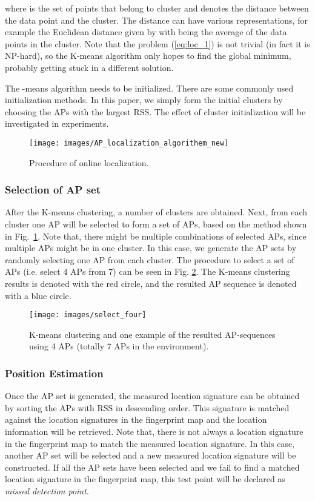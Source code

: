 \documentclass[10pt, conference, letterpaper]{IEEEtran}
\begin{document}
where  is the set of points that belong to cluster  and  denotes the distance between the data point  and the  cluster. 
The distance  can have various representations, for example the Euclidean distance given by  with  being the average of the data points in the  cluster. 
Note that the problem (\ref{eq:loc_1}) is not trivial (in fact it is NP-hard), so the K-means algorithm only hopes to find the global minimum, probably getting stuck in a different solution.

The -means algorithm needs to be initialized. 
There are some commonly used initialization methods. 
In this paper, we simply form the initial  clusters by choosing the  APs with the  largest RSS. 
The effect of cluster initialization will be investigated in experiments.

\begin{figure}
\centering
\texttt{[image: images/AP\_localization\_algorithem\_new]}
\caption{Procedure of online localization.}
\label{fig:algorithm_detailed}
\vspace{-0.2in}
\end{figure}

\subsubsection{Selection of AP set}
After the K-means clustering, a number of  clusters are obtained. 
Next, from each cluster one AP will be selected to form a set of  APs, based on the method shown in Fig.~\ref{fig:algorithm_detailed}. 
Note that, there might be multiple combinations of selected APs, since multiple APs might be in one cluster. 
In this case, we generate the AP sets by randomly selecting one AP from each cluster. 
The procedure to select a set of APs (i.e. select 4 APs from 7) can be seen in Fig. \ref{fig:select_four}. 
The K-means clustering results is denoted with the red circle, and the resulted AP sequence is denoted with a blue circle.\begin{figure}
\centering
\texttt{[image: images/select\_four]}
\caption{K-means clustering and one example of the resulted AP-sequences using 4 APs (totally 7 APs in the environment).}
\label{fig:select_four}
\vspace{-0.1in}
\end{figure}

\subsubsection{Position Estimation}
Once the AP set is generated, the measured location signature can be obtained by sorting the APs with RSS in descending order. 
This signature is matched against the location signatures in the fingerprint map and the location information will be retrieved. 
Note that, there is not always a location signature in the fingerprint map to match the measured location signature. 
In this case, another AP set will be selected and a new measured location signature will be constructed. 
If all the AP sets have been selected and we fail to find a matched location signature in the fingerprint map, this test point will be declared as \emph{missed detection point}.
\end{document}
